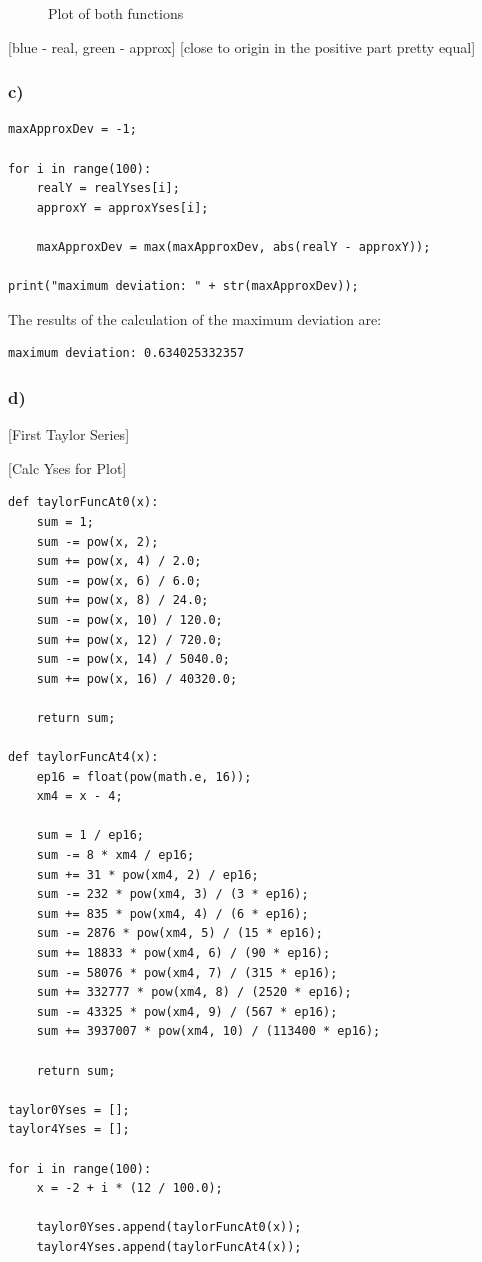 \begin{figure}[h!]
\caption{Plot of both functions}
\end{figure}

[blue - real, green - approx]
[close to origin in the positive part pretty equal]


\subsubsection{c)}

\begin{lstlisting}[caption=Problem 5.9 c)]
maxApproxDev = -1;

for i in range(100):
	realY = realYses[i];
	approxY = approxYses[i];
	
	maxApproxDev = max(maxApproxDev, abs(realY - approxY));

print("maximum deviation: " + str(maxApproxDev));
\end{lstlisting}


The results of the calculation of the maximum deviation are:

\begin{lstlisting}[caption=Result of 5.9 c), keywordstyle=\color{black}]
maximum deviation: 0.634025332357
\end{lstlisting}


\subsubsection{d)}

[First Taylor Series]

[Calc Yses for Plot]

\begin{lstlisting}[caption=todo]
def taylorFuncAt0(x):
	sum = 1;
	sum -= pow(x, 2);
	sum += pow(x, 4) / 2.0;
	sum -= pow(x, 6) / 6.0;
	sum += pow(x, 8) / 24.0;
	sum -= pow(x, 10) / 120.0;
	sum += pow(x, 12) / 720.0;
	sum -= pow(x, 14) / 5040.0;
	sum += pow(x, 16) / 40320.0;
	
	return sum;

def taylorFuncAt4(x):
	ep16 = float(pow(math.e, 16));
	xm4 = x - 4;
	
	sum = 1 / ep16;
	sum -= 8 * xm4 / ep16;
	sum += 31 * pow(xm4, 2) / ep16;
	sum -= 232 * pow(xm4, 3) / (3 * ep16);
	sum += 835 * pow(xm4, 4) / (6 * ep16);
	sum -= 2876 * pow(xm4, 5) / (15 * ep16);
	sum += 18833 * pow(xm4, 6) / (90 * ep16);
	sum -= 58076 * pow(xm4, 7) / (315 * ep16);
	sum += 332777 * pow(xm4, 8) / (2520 * ep16);
	sum -= 43325 * pow(xm4, 9) / (567 * ep16);
	sum += 3937007 * pow(xm4, 10) / (113400 * ep16);
	
	return sum;

taylor0Yses = [];
taylor4Yses = [];

for i in range(100):
	x = -2 + i * (12 / 100.0);
	
	taylor0Yses.append(taylorFuncAt0(x));
	taylor4Yses.append(taylorFuncAt4(x));
\end{lstlisting}

